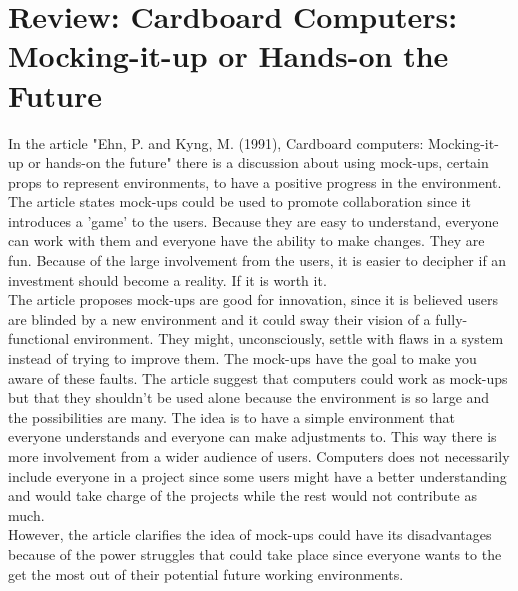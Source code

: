 \message{ !name(Rapport.tex)}\documentclass[12pt]{article}
\begin{document}
\section{Review: Cardboard Computers: Mocking-it-up or Hands-on the Future }
\label{Review1}
In the article "Ehn, P. and Kyng, M. (1991), Cardboard computers: Mocking-it-up or hands-on the future" there is a discussion about using mock-ups, certain props to represent environments, to have a positive progress in the environment. The article states mock-ups could be used to promote collaboration since it introduces a 'game' to the users. Because they are easy to understand, everyone can work with them and everyone have the ability to make changes. They are fun. Because of the large involvement from the users, it is easier to decipher if an investment should become a reality. If it is worth it.\\
The article proposes mock-ups are good for innovation, since it is believed users are blinded by a new environment and it could sway their vision of a fully-functional environment. They might, unconsciously, settle with flaws in a system instead of trying to improve them. The mock-ups have the goal to make you aware of these faults. The article suggest that computers could work as mock-ups but that they shouldn't be used alone because the environment is so large and the possibilities are many. The idea is to have a simple environment that everyone understands and everyone can make adjustments to. This way there is more involvement from a wider audience of users. Computers does not necessarily include everyone in a project since some users might have a better understanding and would take charge of the projects while the rest would not contribute as much.\\
However, the article clarifies the idea of mock-ups could have its disadvantages because of the power struggles that could take place since everyone wants to the get the most out of their potential future working environments.\\
\\
\end{document}
